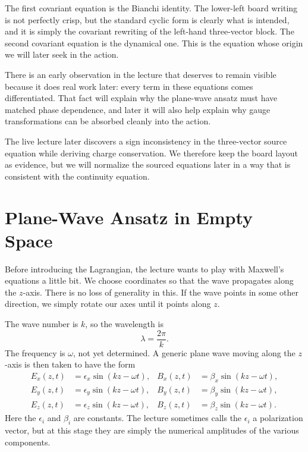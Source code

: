 The first covariant equation is the Bianchi identity. The lower-left board writing is not perfectly crisp, but the standard cyclic form is clearly what is intended, and it is simply the covariant rewriting of the left-hand three-vector block. The second covariant equation is the dynamical one. This is the equation whose origin we will later seek in the action.

There is an early observation in the lecture that deserves to remain visible because it does real work later: every term in these equations comes differentiated. That fact will explain why the plane-wave ansatz must have matched phase dependence, and later it will also help explain why gauge transformations can be absorbed cleanly into the action.

\begin{remark}
The live lecture later discovers a sign inconsistency in the three-vector source equation while deriving charge conservation. We therefore keep the board layout as evidence, but we will normalize the sourced equations later in a way that is consistent with the continuity equation.
\end{remark}

\section{Plane-Wave Ansatz in Empty Space}

Before introducing the Lagrangian, the lecture wants to play with Maxwell's equations a little bit. We choose coordinates so that the wave propagates along the \(z\)-axis. There is no loss of generality in this. If the wave points in some other direction, we simply rotate our axes until it points along \(z\).

The wave number is \(k\), so the wavelength is
\begin{equation}
\lambda=\frac{2\pi}{k}.
\end{equation}
The frequency is \(\omega\), not yet determined. A generic plane wave moving along the \(z\)-axis is then taken to have the form
\begin{align}
E_x(z,t)&=\epsilon_x\sin(kz-\omega t),
&
B_x(z,t)&=\beta_x\sin(kz-\omega t),
\\
E_y(z,t)&=\epsilon_y\sin(kz-\omega t),
&
B_y(z,t)&=\beta_y\sin(kz-\omega t),
\\
E_z(z,t)&=\epsilon_z\sin(kz-\omega t),
&
B_z(z,t)&=\beta_z\sin(kz-\omega t).
\end{align}
Here the \(\epsilon_i\) and \(\beta_i\) are constants. The lecture sometimes calls the \(\epsilon_i\) a polarization vector, but at this stage they are simply the numerical amplitudes of the various components.

